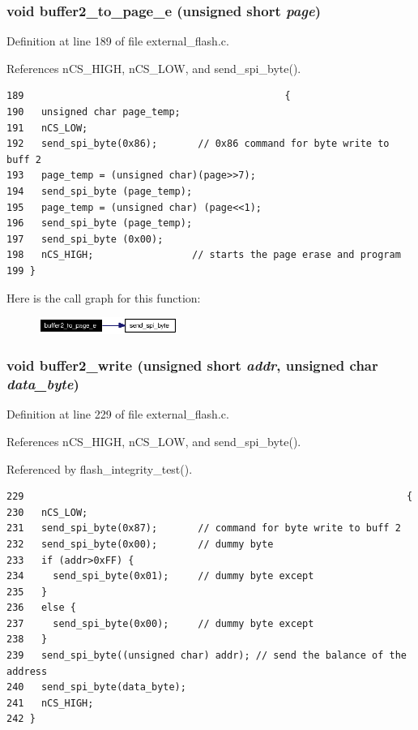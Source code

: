 \subsubsection{\setlength{\rightskip}{0pt plus 5cm}void buffer2\_\-to\_\-page\_\-e (unsigned short {\em page})}\label{external__flash_8c_a5}




Definition at line 189 of file external\_\-flash.c.

References n\-CS\_\-HIGH, n\-CS\_\-LOW, and send\_\-spi\_\-byte().

\footnotesize\begin{verbatim}189                                             {
190   unsigned char page_temp;
191   nCS_LOW;
192   send_spi_byte(0x86);       // 0x86 command for byte write to buff 2
193   page_temp = (unsigned char)(page>>7);
194   send_spi_byte (page_temp);
195   page_temp = (unsigned char) (page<<1);
196   send_spi_byte (page_temp);
197   send_spi_byte (0x00);
198   nCS_HIGH;                 // starts the page erase and program 
199 }
\end{verbatim}\normalsize 




Here is the call graph for this function:\begin{figure}[H]
\begin{center}
\leavevmode
\includegraphics[width=128pt]{external__flash_8c_a5_cgraph}
\end{center}
\end{figure}
\subsubsection{\setlength{\rightskip}{0pt plus 5cm}void buffer2\_\-write (unsigned short {\em addr}, unsigned char {\em data\_\-byte})}\label{external__flash_8c_a8}




Definition at line 229 of file external\_\-flash.c.

References n\-CS\_\-HIGH, n\-CS\_\-LOW, and send\_\-spi\_\-byte().

Referenced by flash\_\-integrity\_\-test().

\footnotesize\begin{verbatim}229                                                                  {
230   nCS_LOW;
231   send_spi_byte(0x87);       // command for byte write to buff 2
232   send_spi_byte(0x00);       // dummy byte
233   if (addr>0xFF) {
234     send_spi_byte(0x01);     // dummy byte except 
235   }
236   else {
237     send_spi_byte(0x00);     // dummy byte except 
238   }  
239   send_spi_byte((unsigned char) addr); // send the balance of the address
240   send_spi_byte(data_byte);
241   nCS_HIGH; 
242 }
\end{verbatim}\normalsize 




